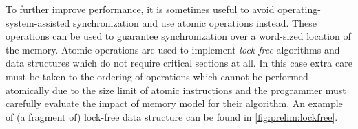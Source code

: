 To further improve performance, it is sometimes useful to avoid
operating-system-assisted synchronization and use atomic operations instead.
These operations can be used to guarantee synchronization over a word-sized
location of the memory.
Atomic operations are used to implement \emph{lock-free} algorithms and data
structures which do not require critical sections at all.
In this case extra care must be taken to the ordering of operations which cannot
be performed atomically due to the size limit of atomic instructions and the
programmer must carefully evaluate the impact of memory model for their
algorithm.
An example of (a fragment of) lock-free data structure can be found in \autoref{fig:prelim:lockfree}.

